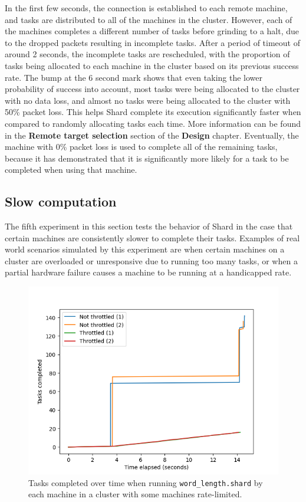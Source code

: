 \documentclass[oneside]{report}
\begin{document}
In the first few seconds, the connection is established to each remote machine, and tasks are distributed to all of the machines in the cluster.
However, each of the machines completes a different number of tasks before grinding to a halt, due to the dropped packets resulting in incomplete tasks.
After a period of timeout of around 2 seconds, the incomplete tasks are rescheduled, with the proportion of tasks being allocated to each machine in the cluster based on its previous success rate.
The bump at the 6 second mark shows that even taking the lower probability of success into account, most tasks were being allocated to the cluster with no data loss, and almost no tasks were being allocated to the cluster with 50\% packet loss.
This helps Shard complete its execution significantly faster when compared to randomly allocating tasks each time.
More information can be found in the \textbf{Remote target selection} section of the \textbf{Design} chapter.
Eventually, the machine with 0\% packet loss is used to complete all of the remaining tasks, because it has demonstrated that it is significantly more likely for a task to be completed when using that machine.

\subsection{Slow computation}
The fifth experiment in this section tests the behavior of Shard in the case that certain machines are consistently slower to complete their tasks.
Examples of real world scenarios simulated by this experiment are when certain machines on a cluster are overloaded or unresponsive due to running too many tasks, or when a partial hardware failure causes a machine to be running at a handicapped rate.

\begin{figure}[h]
  \begin{center}
    \includegraphics[scale=0.9]{img/experiments/e11_1622303333499.png}
    \caption{Tasks completed over time when running \texttt{word\_length.shard} by each machine in a cluster with some machines rate-limited.}
    \label{fig:slowwordlength}
  \end{center}
\end{figure}
\end{document}
